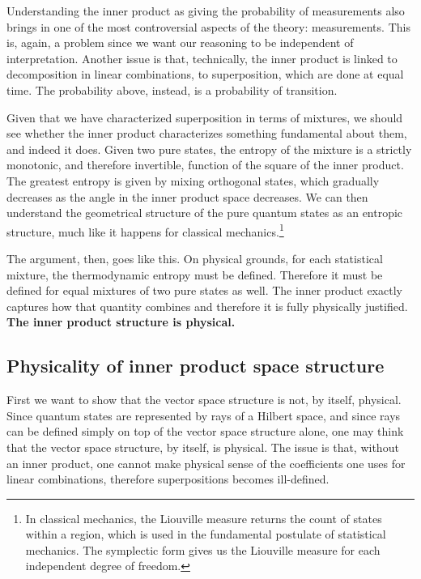 \documentclass[10pt,twocolumn, nofootinbib]{revtex4-2}
\begin{document}
Understanding the inner product as giving the probability of measurements also brings in one of the most controversial aspects of the theory: measurements. This is, again, a problem since we want our reasoning to be independent of interpretation. Another issue is that, technically, the inner product is linked to decomposition in linear combinations, to superposition, which are done at equal time. The probability above, instead, is a probability of transition.

Given that we have characterized superposition in terms of mixtures, we should see whether the inner product characterizes something fundamental about them, and indeed it does. Given two pure states, the entropy of the mixture is a strictly monotonic, and therefore invertible, function of the square of the inner product. The greatest entropy is given by mixing orthogonal states, which gradually decreases as the angle in the inner product space decreases. We can then understand the geometrical structure of the pure quantum states as an entropic structure, much like it happens for classical mechanics.\footnote{In classical mechanics, the Liouville measure returns the count of states within a region, which is used in the fundamental postulate of statistical mechanics. The symplectic form gives us the Liouville measure for each independent degree of freedom.}

The argument, then, goes like this. On physical grounds, for each statistical mixture, the thermodynamic entropy must be defined. Therefore it must be defined for equal mixtures of two pure states as well. The inner product exactly captures how that quantity combines and therefore it is fully physically justified. \textbf{The inner product structure is physical.}


\subsection{Physicality of inner product space structure}

First we want to show that the vector space structure is not, by itself, physical. Since quantum states are represented by rays of a Hilbert space, and since rays can be defined simply on top of the vector space structure alone, one may think that the vector space structure, by itself, is physical. The issue is that, without an inner product, one cannot make physical sense of the coefficients one uses for linear combinations, therefore superpositions becomes ill-defined.
\end{document}
